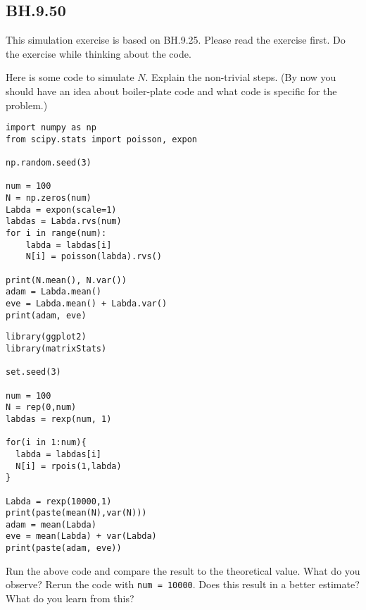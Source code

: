 

\subsection{BH.9.50}

This simulation exercise is based on BH.9.25.  Please read the exercise first. Do the exercise while thinking about the code.

\begin{exercise}
Here is some code to simulate $N$.  Explain the non-trivial steps. (By now you should have an idea about boiler-plate code and what code is specific for the problem.)

\begin{verbatim}
import numpy as np
from scipy.stats import poisson, expon

np.random.seed(3)

num = 100
N = np.zeros(num)
Labda = expon(scale=1)
labdas = Labda.rvs(num)
for i in range(num):
    labda = labdas[i]
    N[i] = poisson(labda).rvs()

print(N.mean(), N.var())
adam = Labda.mean()
eve = Labda.mean() + Labda.var()
print(adam, eve)
\end{verbatim}

\begin{verbatim}
library(ggplot2)
library(matrixStats)

set.seed(3)

num = 100
N = rep(0,num)
labdas = rexp(num, 1) 

for(i in 1:num){
  labda = labdas[i]
  N[i] = rpois(1,labda)
}

Labda = rexp(10000,1)
print(paste(mean(N),var(N)))
adam = mean(Labda)
eve = mean(Labda) + var(Labda)
print(paste(adam, eve))
\end{verbatim}

\end{exercise}

\begin{exercise}
Run the above code and compare the result to the theoretical value. What do you observe? Rerun the code with \texttt{num = 10000}. Does this result in a better estimate? What do you learn from this?
\end{exercise}


